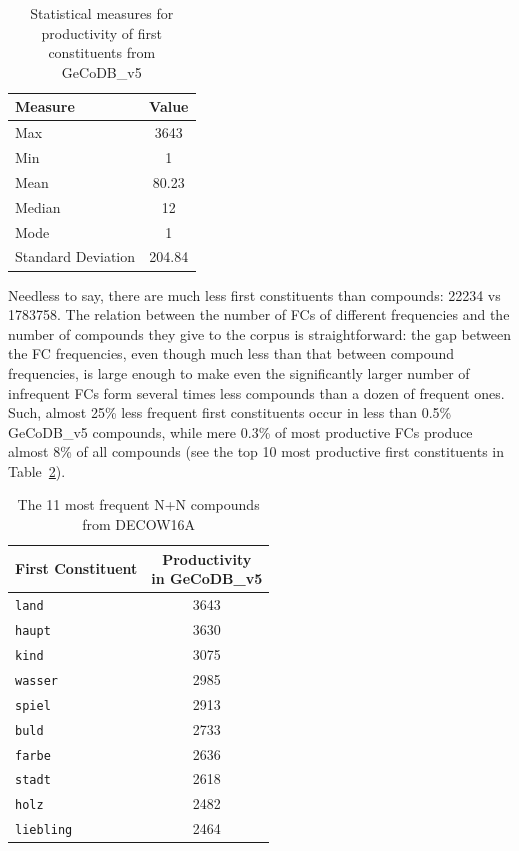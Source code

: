 \documentclass[11pt]{article}
\begin{document}
\begin{table}[hbt!]
\centering
\begin{tabular}{|l|c|}
\hline
\textbf{Measure} & \textbf{Value} \\ \hline
Max   & 3643 \\ \hline
Min   & 1 \\ \hline
Mean  & 80.23 \\ \hline
Median & 12 \\ \hline
Mode  & 1 \\ \hline
Standard Deviation    & 204.84 \\ \hline
\end{tabular}
\caption{Statistical measures for productivity of first constituents from GeCoDB\_v5}
\label{tab:fc_stats}
\end{table}


Needless to say, there are much less first constituents than compounds: 22234 vs 1783758. The relation between the number of FCs of different frequencies and the number of compounds they give to the corpus is straightforward: the gap between the FC frequencies, even though much less than that between compound frequencies, is large enough to make even the significantly larger number of infrequent FCs form several times less compounds than a dozen of frequent ones. Such, almost 25\% less frequent first constituents occur in less than 0.5\% GeCoDB\_v5 compounds, while mere 0.3\% of most productive FCs produce almost 8\% of all compounds (see the top 10 most productive first constituents in Table~\ref{tab:10_most_common_fcs}).

\begin{table}[h]
\centering
\begin{tabular}{|l|c|}
\hline
\textbf{First Constituent} & \makecell{\textbf{Productivity} \\ \textbf{in GeCoDB\_v5}} \\ \hline
\texttt{land}           & 3643 \\ \hline
\texttt{haupt}            & 3630 \\ \hline
\texttt{kind}     & 3075 \\ \hline
\texttt{wasser}          & 2985 \\ \hline
\texttt{spiel}         & 2913 \\ \hline
\texttt{buld}           & 2733 \\ \hline
\texttt{farbe}           & 2636 \\ \hline
\texttt{stadt}         & 2618 \\ \hline
\texttt{holz}     & 2482 \\ \hline
\texttt{liebling}          & 2464 \\ \hline
\end{tabular}
\caption{The 11 most frequent N+N compounds from DECOW16A}
\label{tab:10_most_common_fcs}
\end{table}
\end{document}
